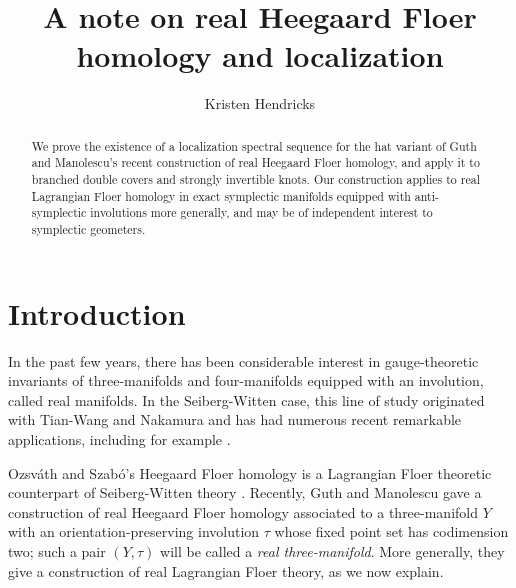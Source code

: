 \documentclass[11pt,reqno]{amsart}
\title{A note on real Heegaard Floer homology and localization}
\author{Kristen Hendricks}
\theoremstyle{definition}
\theoremstyle{remark}
\numberwithin{equation}{section}
\begin{document}
\begin{abstract} We prove the existence of a localization spectral sequence for the hat variant of Guth and Manolescu's recent construction of real Heegaard Floer homology, and apply it to branched double covers and strongly invertible knots. Our construction applies to real Lagrangian Floer homology in exact symplectic manifolds equipped with anti-symplectic involutions more generally, and may be of independent interest to symplectic geometers.
\end{abstract}



\maketitle

\tableofcontents


\section{Introduction}

In the past few years, there has been considerable interest in gauge-theoretic invariants of three-manifolds and four-manifolds equipped with an involution, called real manifolds. In the Seiberg-Witten case, this line of study originated with Tian-Wang \cite{TW:real} and Nakamura \cite{Nakamura:real, Nakamura:intersection} and has had numerous recent remarkable applications, including for example \cite{Kato, Miyazawa, KPT:cables, HKM:branched, Baraglia}.

Ozsv{\'a}th and Szab{\'o}'s Heegaard Floer homology is a Lagrangian Floer theoretic counterpart of Seiberg-Witten theory \cite{OSDisks, OSProperties}. Recently, Guth and Manolescu \cite{GM:real} gave a construction of real Heegaard Floer homology associated to a three-manifold $Y$ with an orientation-preserving involution $\tau$ whose fixed point set has codimension two; such a pair $(Y, \tau)$ will be called a \emph{real three-manifold}. More generally, they give a construction of real Lagrangian Floer theory, as we now explain. 
\end{document}
